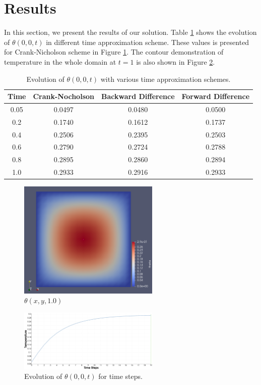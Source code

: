 \documentclass[]{article}
\begin{document}
\section{Results} \label{sec: rst}
In this section, we present the results of our solution. Table \ref{tab1} shows the evolution of $\theta(0, 0, t)$ in different time approximation scheme. These values is presented for Crank-Nicholson scheme in Figure \ref{fig_Rs}. The contour demonstration of temperature in the whole domain at $t=1$ is also shown in Figure \ref{fig_Rs2}. 
\begin{table}
	\caption{Evolution of $\theta(0, 0, t)$ with various time
		approximation schemes.}
	\label{tab1}
	\begin{center}
		\begin{tabular}{|c| c| c| c|} 
			\hline
			Time & Crank-Nocholson & Backward Difference & Forward Difference\\ [0.7ex] 
			\hline\hline
			0.05 & 0.0497 & 0.0480 & 0.0500\\  [0.2ex] 
			\hline
			0.2 & 0.1740 & 0.1612 & 0.1737\\ [0.2ex] 
			\hline
			0.4 & 0.2506 & 0.2395 & 0.2503\\ [0.2ex] 
			\hline
			0.6 & 0.2790 & 0.2724 & 0.2788\\ [0.2ex] 
			\hline
			0.8 & 0.2895 & 0.2860 & 0.2894\\ [0.2ex] 
			\hline
			1.0 & 0.2933 & 0.2916 & 0.2933\\ [0.2ex] 
			\hline
		\end{tabular}
	\end{center}
\end{table}
\begin{figure}[htbp]
	\centering
	\includegraphics[width=0.6\textwidth]{Figures/result1.png}
	\caption{$\theta(x, y, 1.0)$}
	\label{fig_Rs}
\end{figure}
\begin{figure}[htbp]
	\centering
	\includegraphics[width=0.6\textwidth]{Figures/result2.png}
	\caption{Evolution of $\theta(0, 0, t)$ for time steps.}
	\label{fig_Rs2}
\end{figure}


\end{document}
